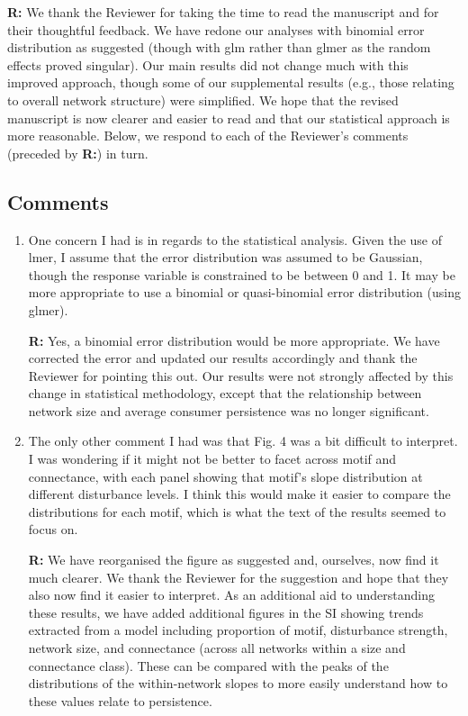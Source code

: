 \documentclass[12pt]{article}
\begin{document}
    \textbf{R:} We thank the Reviewer for taking the time to read the manuscript and for their thoughtful feedback. We have redone our analyses with binomial error distribution as suggested (though with glm rather than glmer as the random effects proved singular). Our main results did not change much with this improved approach, though some of our supplemental results (e.g., those relating to overall network structure) were simplified. We hope that the revised manuscript is now clearer and easier to read and that our statistical approach is more reasonable. Below, we respond to each of the Reviewer's comments (preceded by \textbf{R:}) in turn.

    \subsection*{Comments}

        \begin{enumerate}

            \item One concern I had is in regards to the statistical analysis. Given the use of lmer, I assume that the error distribution was assumed to be Gaussian, though the response variable is constrained to be between 0 and 1. It may be more appropriate to use a binomial or quasi-binomial error distribution (using glmer).

            \textbf{R:} Yes, a binomial error distribution would be more appropriate. We have corrected the error and updated our results accordingly and thank the Reviewer for pointing this out. Our results were not strongly affected by this change in statistical methodology, except that the relationship between network size and average consumer persistence was no longer significant.

            \item The only other comment I had was that Fig. 4 was a bit difficult to interpret. I was wondering if it might not be better to facet across motif and connectance, with each panel showing that motif's slope distribution at different disturbance levels. I think this would make it easier to compare the distributions for each motif, which is what the text of the results seemed to focus on.

            \textbf{R:} We have reorganised the figure as suggested and, ourselves, now find it much clearer. We thank the Reviewer for the suggestion and hope that they also now find it easier to interpret. As an additional aid to understanding these results, we have added additional figures in the SI showing trends extracted from a model including proportion of motif, disturbance strength, network size, and connectance (across all networks within a size and connectance class). These can be compared with the peaks of the distributions of the within-network slopes to more easily understand how to these values relate to persistence.

        \end{enumerate}
\end{document}
